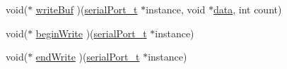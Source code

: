 \begin{DoxyCompactItemize}
\item 
void($\ast$ \hyperlink{structserial__port__ops_a7ed6642267f54168a1c074b6bea2f996}{write\+Buf} )(\hyperlink{drivers_2serial_8h_a64a5e2f04e1a908fbb1b3b165f88e0ef}{serial\+Port\+\_\+t} $\ast$instance, void $\ast$\hyperlink{transponder_8h_a8bfd79faff98a8b652ff64958dec9a18}{data}, int count)
\item 
void($\ast$ \hyperlink{structserial__port__ops_aa90d516e11def22b513dcac0fb86746d}{begin\+Write} )(\hyperlink{drivers_2serial_8h_a64a5e2f04e1a908fbb1b3b165f88e0ef}{serial\+Port\+\_\+t} $\ast$instance)
\item 
void($\ast$ \hyperlink{structserial__port__ops_a0da4d2c209d8ec5b95005f5573d89385}{end\+Write} )(\hyperlink{drivers_2serial_8h_a64a5e2f04e1a908fbb1b3b165f88e0ef}{serial\+Port\+\_\+t} $\ast$instance)
\end{DoxyCompactItemize}


